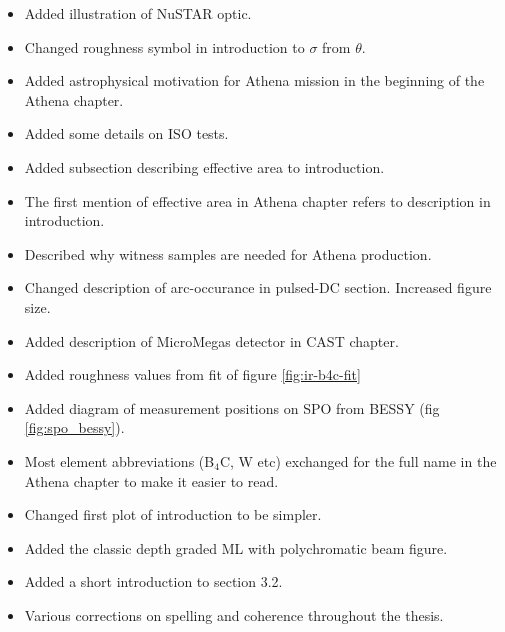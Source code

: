 \begin{itemize}
  \item Added illustration of NuSTAR optic.
  \item Changed roughness symbol in introduction to $\sigma$ from $\theta$.
  \item Added astrophysical motivation for Athena mission in the beginning of the Athena chapter.
  \item Added some details on ISO tests.
  \item Added subsection describing effective area to introduction.
  \item The first mention of effective area in Athena chapter refers to description in introduction.
  \item Described why witness samples are needed for Athena production.
  \item Changed description of arc-occurance in pulsed-DC section. Increased figure size.
  \item Added description of MicroMegas detector in CAST chapter.
  \item Added roughness values from fit of figure \ref{fig:ir-b4c-fit}
  \item Added diagram of measurement positions on SPO from BESSY (fig \ref{fig:spo_bessy}).
  \item Most element abbreviations (B$_4$C, W etc) exchanged for the full name in the Athena chapter to make it easier to read.
  \item Changed first plot of introduction to be simpler.
  \item Added the classic depth graded ML with polychromatic beam figure.
  \item Added a short introduction to section 3.2.

  \item Various corrections on spelling and coherence throughout the thesis.
\end{itemize}

